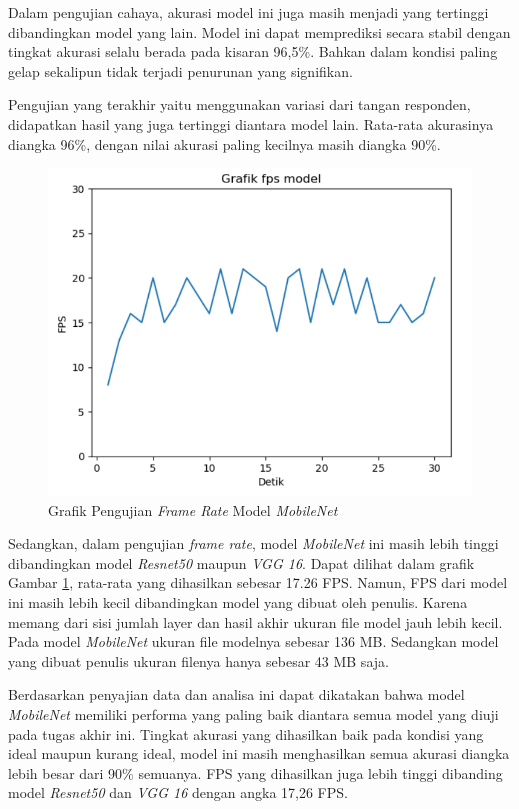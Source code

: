 Dalam pengujian cahaya, akurasi model ini juga masih menjadi yang tertinggi dibandingkan model yang lain. Model ini dapat memprediksi secara stabil dengan tingkat akurasi selalu berada pada kisaran 96,5\%. Bahkan dalam kondisi paling gelap sekalipun tidak terjadi penurunan yang signifikan. 

Pengujian yang terakhir yaitu menggunakan variasi dari tangan responden, didapatkan hasil yang juga tertinggi diantara model lain. Rata-rata akurasinya diangka 96\%, dengan nilai akurasi paling kecilnya masih diangka 90\%.

\begin{figure}[!htb]
  \centering
  \includegraphics[scale=0.8]{gambar/pengujian-fps/grafik-pengujian-fps-mobilenet.png}
  \caption{Grafik Pengujian \emph{Frame Rate} Model \emph{MobileNet}}
  \label{fig:Grafik Pengujian Frame Rate Model MobileNet}
\end{figure}

Sedangkan, dalam pengujian \emph{frame rate}, model \emph{MobileNet} ini masih lebih tinggi dibandingkan model \emph{Resnet50} maupun \emph{VGG 16}. Dapat dilihat dalam grafik Gambar \ref{fig:Grafik Pengujian Frame Rate Model MobileNet}, rata-rata yang dihasilkan sebesar 17.26 FPS. Namun, FPS dari model ini masih lebih kecil dibandingkan model yang dibuat oleh penulis. Karena memang dari sisi jumlah layer dan hasil akhir ukuran file model jauh lebih kecil. Pada model \emph{MobileNet} ukuran file modelnya sebesar 136 MB. Sedangkan model yang dibuat penulis ukuran filenya hanya sebesar 43 MB saja.

Berdasarkan penyajian data dan analisa ini dapat dikatakan bahwa model \emph{MobileNet} memiliki performa yang paling baik diantara semua model yang diuji pada tugas akhir ini. Tingkat akurasi yang dihasilkan baik pada kondisi yang ideal maupun kurang ideal, model ini masih menghasilkan semua akurasi diangka lebih besar dari 90\% semuanya. FPS yang dihasilkan juga lebih tinggi dibanding model \emph{Resnet50} dan \emph{VGG 16} dengan angka 17,26 FPS.

